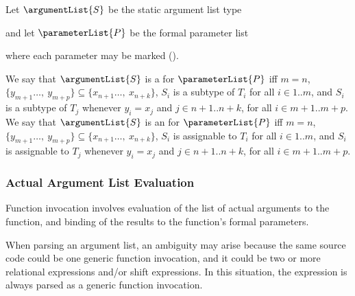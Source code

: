 \documentclass[makeidx]{article}
\begin{document}
{\LMHash{}%
Let $\argumentList{S}$ be the static argument list type

\noindent
{}

\noindent
and let $\parameterList{P}$ be the formal parameter list

\noindent
{}

\noindent
where each parameter may be marked \COVARIANT{}
().

\LMHash{}%
We say that $\argumentList{S}$ is
a  for $\parameterList{P}$
if{}f $m = n$,
$\{y_{m+1}\ldots,\ y_{m+p}\} \subseteq \{x_{n+1}\ldots,\ x_{n+k}\}$,
$S_i$ is a subtype of $T_i$ for all $i \in 1 .. m$,
and $S_i$ is a subtype of $T_j$ whenever $y_i = x_j$ and
$j \in n + 1 .. n + k$, for all
$i \in m + 1 .. m + p$.
We say that $\argumentList{S}$
is an  for $\parameterList{P}$
if{}f $m = n$,
$\{y_{m+1}\ldots,\ y_{m+p}\} \subseteq \{x_{n+1}\ldots,\ x_{n+k}\}$,
$S_i$ is assignable to $T_i$ for all $i \in 1 .. m$,
and $S_i$ is assignable to $T_j$ whenever $y_i = x_j$ and
$j \in n + 1 .. n + k$, for all
$i \in m + 1 .. m + p$.



\subsubsection{Actual Argument List Evaluation}

\LMHash{}%
Function invocation involves evaluation of
the list of actual arguments to the function,
and binding of the results to the function's formal parameters.

\LMHash{}%
When parsing an argument list, an ambiguity may arise because
the same source code could be one generic function invocation,
and it could be two or more relational expressions and/or shift expressions.
In this situation, the expression is always parsed
as a generic function invocation.


}
\end{document}
